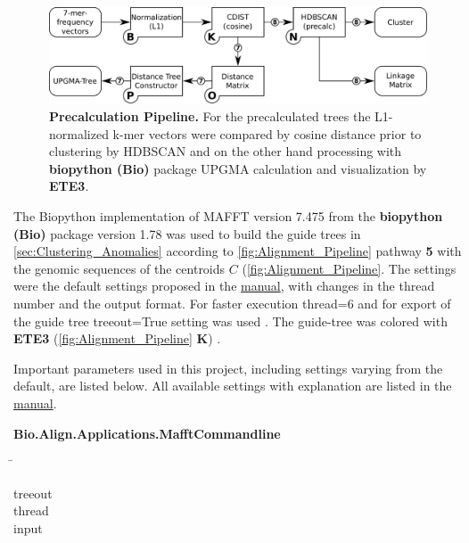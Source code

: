\begin{figure}[!hbt]
    \centering
    \includegraphics[width=\textwidth]{Graphics/Precalculated.pdf}
    \caption[Precalculation Pipeline]{\textbf{Precalculation Pipeline.} For the precalculated trees the L1-normalized k-mer vectors were compared by cosine distance prior to clustering by \gls{HDBSCAN} and on the other hand processing with \textbf{biopython (Bio)} package \gls{UPGMA} calculation and visualization by \textbf{ETE3}.}
    \label{fig:Precalc_Pipeline}
\end{figure}

The Biopython implementation of MAFFT version 7.475 from the \textbf{biopython (Bio)} package version 1.78 was used to build the guide trees in \autoref{sec:Clustering_Anomalies} according to \autoref{fig:Alignment_Pipeline} pathway \textsf{\textbf{5}} with the genomic sequences of the centroids $C$ \autocite{katoh_mafft_2013, cock_biopython_2009} (\autoref{fig:Alignment_Pipeline}. The settings were the default settings proposed in the \href{https://mafft.cbrc.jp/alignment/software/}{manual}, with changes in the thread number and the output format. For faster execution \colorbox{backcolour}{thread=6} and for export of the guide tree \colorbox{backcolour}{treeout=True} setting was used \autocite{katoh_mafft_2013, cock_biopython_2009}. The guide-tree was colored with \textbf{ETE3} (\autoref{fig:Alignment_Pipeline} \textsf{\textbf{K}}) \autocite{huerta-cepas_ete_2016}.

Important parameters used in this project, including settings varying from the default, are listed below. All available settings with explanation are listed in the \href{https://mafft.cbrc.jp/alignment/software/}{manual}.

\begin{leftbar}
    \textbf{Bio.Align.Applications.MafftCommandline}
    \begin{nstabbing}
        \qquad\qquad\qquad\qquad\qquad\quad\=\kill
    
        treeout \\
        
        thread \\
        
        input 
        
    \end{nstabbing}
\end{leftbar}

